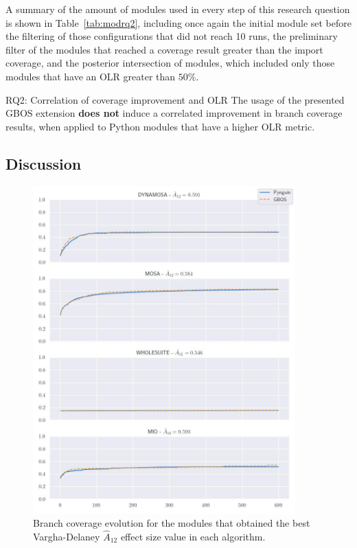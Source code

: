 \documentclass[%
  chapterprefix=false,%
  open=right,%
  twoside=true,%
  paper=a4,%
  logofile={Figures/logo.png},%
  thesistype=master,%
  UKenglish,%
]{se2thesis}
\begin{document}
A summary of the amount of modules used in every step of this research question is shown in Table~\ref{tab:modrq2}, including once again the initial module set before the filtering of those configurations that did not reach 10 runs, the preliminary filter of the modules that reached a coverage result greater than the import coverage, and the posterior intersection of modules, which included only those modules that have an OLR greater than \(50\%\).

\begin{table}[t]
  \centering
  
\caption{Amount of modules used while analysing each experimental configuration for the answering of Research Question 2.}\label{tab:modrq2}
\end{table}

\begin{summary}{RQ2: Correlation of coverage improvement and OLR}
  The usage of the presented GBOS extension \textbf{does not} induce a correlated improvement in branch coverage results, when applied to Python modules that have a higher OLR metric.
\end{summary}

\subsection*{Discussion}

\begin{figure}[ptbh]
  \centering
  \includegraphics[width=0.9\textwidth]{Figures/Results/bestA12.jpg}
  \caption{Branch coverage evolution for the modules that obtained the best Vargha-Delaney \(\hat{A}_{12}\) effect size value in each algorithm.}\label{fig:besta12}
\end{figure}
\end{document}
